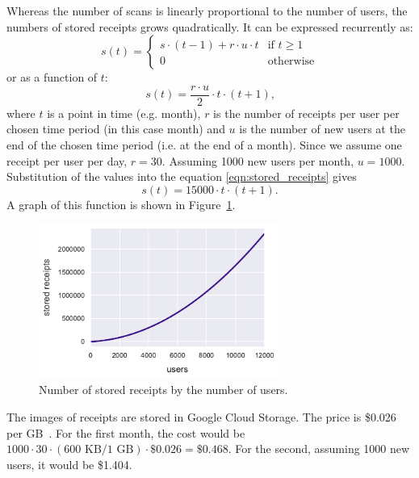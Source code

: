\documentclass[
  digital, %
  table,   %
  oneside, %
  lof,     %
  lot,     %
]{fithesis3}
\begin{document}
Whereas the number of scans is linearly proportional to the number of users, the numbers of stored receipts grows quadratically. It can be expressed recurrently as: 
\begin{equation}
    s(t) = \begin{cases}
        s \cdot (t-1) + r \cdot u \cdot t & \text{if }t\geq1\\
        0 & \text{otherwise}
    \end{cases}
\end{equation}
or as a function of $t$:
\begin{equation}
\label{eqn:stored_receipts}
s(t) = \frac{r \cdot u}{2} \cdot t \cdot (t + 1)\text{,}
\end{equation}
where $t$ is a point in time (e.g. month), $r$ is the number of receipts per user per chosen time period (in this case month) and $u$ is the number of new users at the end of the chosen time period (i.e. at the end of a month). Since we assume one receipt per user per day, $r = 30$. Assuming \num{1000} new users per month, $u = \num{1000}$. 
Substitution of the values into the equation \ref{eqn:stored_receipts} gives
\begin{equation}
s(t) = \num{15000} \cdot t \cdot (t + 1)\text{.}
\end{equation}
A graph of this function is shown in Figure~\ref{fig:receipts_by_users}.

\begin{figure}
    \begin{center}
        \includegraphics[width=0.7\textwidth]{figures/graphs/receipts_by_users}
    \end{center}
    \caption{Number of stored receipts by the number of users.}
    \label{fig:receipts_by_users}
\end{figure}

The images of receipts are stored in Google Cloud Storage. The price is \$0.026 per GB~\cite{CloudStoragePricing}. For the first month, the cost would be $\num{1000} \cdot 30 \cdot (600\text{ KB} / 1\text{ GB}) \cdot \$0.026 = \$0.468$.
For the second, assuming \num{1000} new users, it would be \$1.404.
\end{document}
